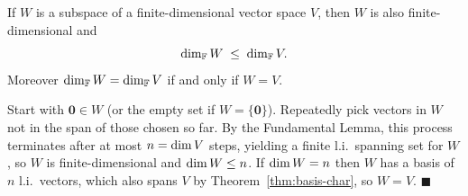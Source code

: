 \begin{thmbox}
\label{thm:subspace-dim}
If $W$ is a subspace of a finite-dimensional vector space $V$, then $W$ is
also finite-dimensional and
\[
    \operatorname{dim}_{\mathbb{F}} W \;\le\; \operatorname{dim}_{\mathbb{F}} V.
\]
Moreover $\operatorname{dim}_{\mathbb{F}} W = \operatorname{dim}_{\mathbb{F}} V$ if and only if $W=V$.
\end{thmbox}

\begin{proofbox}
Start with $\mathbf{0}\in W$ (or the empty set if $W=\{\mathbf{0}\}$).
Repeatedly pick vectors in $W$ not in the span of those chosen so far.  By the
Fundamental Lemma, this process terminates after at most $n=\operatorname{dim} V$ steps,
yielding a finite l.i.\ spanning set for $W$, so $W$ is finite-dimensional and
$\operatorname{dim} W\le n$.  If $\operatorname{dim} W=n$ then $W$ has a basis of $n$ l.i.\ vectors,
which also spans $V$ by Theorem~\ref{thm:basis-char}, so $W=V$.
\hfill$\blacksquare$
\end{proofbox}
